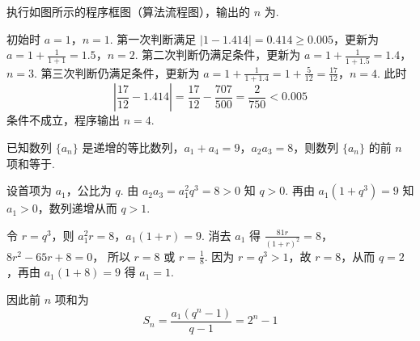 \begin{problem}
执行如图所示的程序框图（算法流程图），输出的 \(n\) 为\fillinblank{}.


\begin{solution}
初始时 \(a=1\)，\(n=1\). 第一次判断满足 \(|1-1.414|=0.414\geqslant0.005\)，更新为
\(a=1+\frac1{1+1}=1.5\)，\(n=2\).
第二次判断仍满足条件，更新为
\(a=1+\frac1{1+1.5}=1.4\)，\(n=3\).
第三次判断仍满足条件，更新为
\(a=1+\frac1{1+1.4}=1+\frac5{12}=\frac{17}{12}\)，\(n=4\).
此时
\[
\left|\frac{17}{12}-1.414\right|=\frac{17}{12}-\frac{707}{500}=\frac2{750}<0.005
\]
条件不成立，程序输出 \(n=4\).
\end{solution}
\end{problem}

\begin{problem}
已知数列 \( \{a_{n}\} \) 是递增的等比数列，\( a_{1} + a_{4} = 9 \)，\( a_{2}a_{3} = 8 \)，则数列 \( \{a_{n}\} \) 的前 \(n\) 项和等于\fillinblank{}.

\begin{solution}
设首项为 \(a_1\)，公比为 \(q\). 由 \(a_2a_3=a_1^2q^3=8>0\) 知 \(q>0\). 再由
\(a_1(1+q^3)=9\) 知 \(a_1>0\)，数列递增从而 \(q>1\).

令 \(r=q^3\)，则
\(a_1^2r=8\)，\(a_1(1+r)=9\).
消去 \(a_1\) 得
\(\frac{81r}{(1+r)^2}=8\)，\(8r^2-65r+8=0\)，
所以 \(r=8\) 或 \(r=\frac18\). 因为 \(r=q^3>1\)，故 \(r=8\)，从而 \(q=2\)，再由 \(a_1(1+8)=9\) 得 \(a_1=1\).

因此前 \(n\) 项和为
\[
S_n=\frac{a_1(q^n-1)}{q-1}=2^n-1
\]
\end{solution}
\end{problem}

